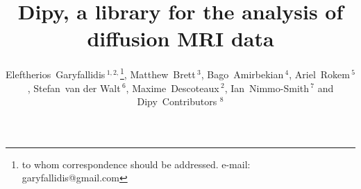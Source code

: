 \documentclass{bioinfo}
\begin{document}

\title[DIPY]{Dipy, a library for the analysis of diffusion MRI data}

\author[Garyfallidis, Brett, Amirbekian, Rokem, van der Walt, Descoteaux,
  Nimmo-Smith]{Eleftherios~Garyfallidis\,$^{1,2,}$\footnote{to whom correspondence should be addressed. e-mail:
    garyfallidis@gmail.com}, Matthew~Brett\,$^{3}$,
  Bago~Amirbekian\,$^{4}$, Ariel~Rokem\,$^{5}$, Stefan~van der Walt\,$^{6}$,
  Maxime~Descoteaux\,$^{2}$, Ian~Nimmo-Smith\,$^{7}$ and Dipy~Contributors
  $^{8}$}

\address{\,$^{1}$University of Sherbrooke, Sherbrooke, CA\\
  \,$^{2}$University of Cambridge, Cambridge, UK\\
  \,$^{3}$University of California, Henry H. Wheeler, Jr. Brain Imaging Center, Berkeley, CA.\\
  \,$^{4}$University of California, San Francisco, CA, USA\\
  \,$^{5}$Stanford University, Stanford, CA, USA\\
  \,$^{6}$Stellenbosch University, Stellenbosch, South Africa\\
  \,$^{7}$MRC Cognition and Brain Sciences Unit, Cambridge, UK\\
  \,$^{8}$\texttt{http://dipy.org/developers.html}
  }
\history{}

\editor{}

\maketitle
\end{document}

